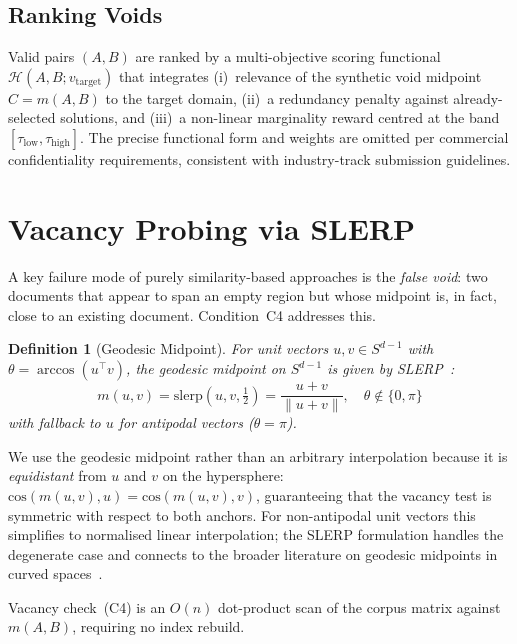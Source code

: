 \documentclass[11pt,twocolumn]{article}
\newtheorem{definition}{Definition}
\newcommand{\vtarget}{v_{\mathrm{target}}}
\newcommand{\taulow}{\tau_{\mathrm{low}}}
\newcommand{\tauhigh}{\tau_{\mathrm{high}}}
\begin{document}
\subsection{Ranking Voids}

Valid pairs $(A, B)$ are ranked by a multi-objective scoring
functional $\mathcal{H}(A, B; \vtarget)$ that integrates
(i)~relevance of the synthetic void midpoint $C = m(A,B)$ to the
target domain, (ii)~a redundancy penalty against already-selected
solutions, and (iii)~a non-linear marginality reward centred at
the band $[\taulow, \tauhigh]$.  The precise functional form and
weights are omitted per commercial confidentiality requirements,
consistent with industry-track submission guidelines.

\section{Vacancy Probing via SLERP}
\label{sec:vacancy}

A key failure mode of purely similarity-based approaches is the
\emph{false void}: two documents that appear to span an empty region
but whose midpoint is, in fact, close to an existing document.
Condition~C4 addresses this.

\begin{definition}[Geodesic Midpoint]
\label{def:slerp}
For unit vectors $u, v \in S^{d-1}$ with $\theta = \arccos(u^\top v)$,
the geodesic midpoint on $S^{d-1}$ is given by SLERP~\cite{shoemake1985slerp}:
\[
  m(u,v) = \mathrm{slerp}(u,v,\tfrac{1}{2}) =
  \frac{u + v}{\|u + v\|},
  \quad \theta \not\in \{0,\pi\}
\]
with fallback to $u$ for antipodal vectors ($\theta = \pi$).
\end{definition}

We use the geodesic midpoint rather than an arbitrary interpolation
because it is \emph{equidistant} from $u$ and $v$ on the hypersphere:
$\mathrm{cos}(m(u,v), u) = \mathrm{cos}(m(u,v), v)$, guaranteeing
that the vacancy test is symmetric with respect to both anchors.
For non-antipodal unit vectors this simplifies to
normalised linear interpolation; the SLERP formulation handles
the degenerate case and connects to the broader literature on
geodesic midpoints in curved spaces~\cite{shoemake1985slerp}.

Vacancy check~(C4) is an $O(n)$ dot-product scan of the corpus matrix
against $m(A,B)$, requiring no index rebuild.

\end{document}
